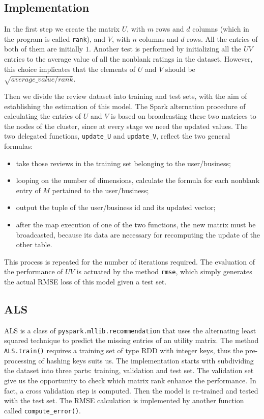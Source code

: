 \documentclass{article}
\begin{document}
    \subsection{Implementation}
    In the first step we create the matrix $U$, with $m$ rows and $d$ columns (which in the program is called \texttt{rank}),  and $V$, with $n$ columns and $d$ rows. All the entries of both of them are initially $1$. Another test is performed by initializing all the $UV$ entries to the average value of all the nonblank ratings in the dataset. However, this choice implicates that the elements of $U$ and $V$ should be $\sqrt{average\_value/rank}$.
    
    Then we divide the review dataset into training and test sets, with the aim of establishing the estimation of this model. 
    The Spark alternation procedure of calculating the entries of $U$ and $V$ is based on broadcasting these two matrices to the nodes of the cluster, since at every stage we need the updated values. 
    The two delegated functions, \texttt{update\_U} and \texttt{update\_V}, reflect the two general formulas:
    \begin{itemize}
        \item take those reviews in the training set belonging to the user/business;
        \item looping on the number of dimensions, calculate the formula for each nonblank entry of $M$ pertained to the user/business;
        \item output the tuple of the user/business id and its updated vector;
        \item after the map execution of one of the two functions, the new matrix must be broadcasted, because its data are necessary for recomputing the update of the other table. 
    \end{itemize}

    This process is repeated for the number of iterations required. The evaluation of the performance of $UV$ is actuated by the method \texttt{rmse}, which simply generates the actual RMSE loss of this model given a test set. 

\subsection{ALS}
ALS is a class of \texttt{pyspark.mllib.recommendation} \cite{als} that uses the alternating least squared technique \cite{ALS2} to predict the missing entries of an utility matrix. The method \texttt{ALS.train()} requires a training set of type RDD with integer keys, thus the pre-processing of hashing keys suits us. 
The implementation starts with subdividing the dataset into three parts: training, validation and test set. The validation set give us the opportunity to check which matrix rank enhance the performance. In fact, a cross validation step is computed. Then the model is re-trained and tested with the test set. The RMSE calculation is implemented by another function called \texttt{compute\_error()}.
  
\end{document}
